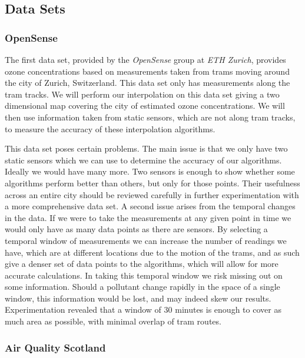 		\subsection{Data Sets}\label{prediction_evaluation_methodology_data_sets}

			\subsubsection{OpenSense}\label{prediction_evaluation_methodology_data_sets_opensense}
				The first data set, provided by the \emph{OpenSense} group at \emph{ETH Zurich}, provides ozone concentrations based on measurements taken from trams moving around the city of Zurich, Switzerland. This data set only has measurements along the tram tracks. We will perform our interpolation on this data set giving a two dimensional map covering the city of estimated ozone concentrations. We will then use information taken from static sensors, which are not along tram tracks, to measure the accuracy of these interpolation algorithms. 


				This data set poses certain problems. The main issue is that we only have two static sensors which we can use to determine the accuracy of our algorithms. Ideally we would have many more. Two sensors is enough to show whether some algorithms perform better than others, but only for those points. Their usefulness across an entire city should be reviewed carefully in further experimentation with a more comprehensive data set. A second issue arises from the temporal changes in the data. If we were to take the measurements at any given point in time we would only have as many data points as there are sensors. By selecting a temporal window of measurements we can increase the number of readings we have, which are at different locations due to the motion of the trams, and as such give a denser set of data points to the algorithms, which will allow for more accurate calculations. In taking this temporal window we risk missing out on some information. Should a pollutant change rapidly in the space of a single window, this information would be lost, and may indeed skew our results. Experimentation revealed that a window of 30 minutes is enough to cover as much area as possible, with minimal overlap of tram routes. 


			\subsubsection{Air Quality Scotland}\label{prediction_evaluation_methodology_data_sets_air_quality_scotland}


